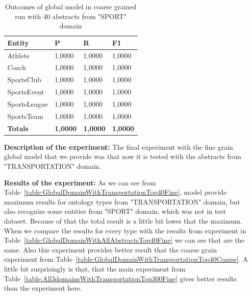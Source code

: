 \documentclass[thesis=M,english]{FITthesis}[2018/05/30]
\begin{document}
	\begin{table}[H]\centering
		\begin{tabular}{|l|l|l|l|}
			\hline {\textbf{Entity}} & {\textbf{P}} & {\textbf{R}} & {\textbf{F1}}\\\hline
				Athlete & 1,0000 & 1,0000 & 1,0000\\
				Coach & 1,0000 & 1,0000 & 1,0000\\
				SportsClub & 1,0000 & 1,0000 & 1,0000\\
				SportsEvent & 1,0000 & 1,0000 & 1,0000\\
				SportsLeague & 1,0000 & 1,0000 & 1,0000\\
				SportsTeam & 1,0000 & 1,0000 & 1,0000\\\hline
				\textbf{Totals} & \textbf{1,0000} & \textbf{1,0000} & \textbf{1,0000}\\\hline
		\end{tabular}
		\caption{Outcomes of global model in coarse grained run with 40 abstracts from "SPORT" domain \label{table:GlobalDomainWithSportTop40Fine}}
	\end{table}	


	\textbf{Description of the experiment:} The final experiment with the fine grain global model that we provide was that now it is tested with the abstracts from "TRANSPORTATION" domain.

	\textbf{Results of the experiment:} As we can see from Table~\ref{table:GlobalDomainWithTransportationTop40Fine}, model provide maximum results for ontology types from "TRANSPORTATION" domain, but also recognize some entities from "SPORT" domain, which was not in test dataset. Because of that the total result is a little bit lower that the maximum. When we compare the results for every type with the results from experiment in Table~\ref{table:GlobalDomainWithAllAbstractsTop40Fine} we can see that are the same. Also this experiment provides better result that the coarse grain experiment from Table~\ref{table:GlobalDomainWithTransportationTop40Coarse}. A little bit surprisingly is that, that the main experiment from Table~\ref{table:All3domainsWithTransportationTop300Fine} gives better results than the experiment here.   
\end{document}
